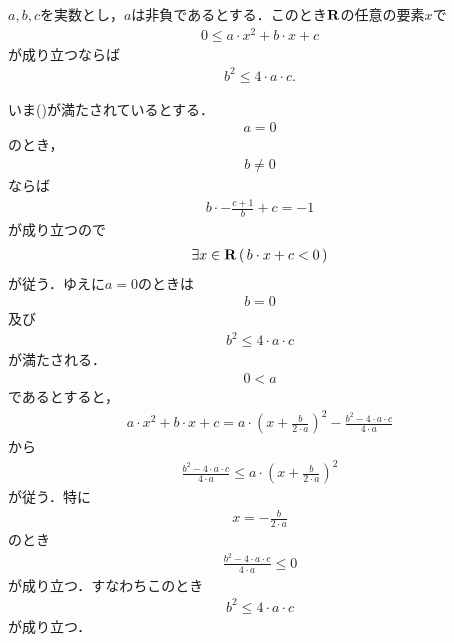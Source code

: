 	\begin{screen}
		\begin{thm}[二次関数が非負であるための条件]
		\label{thm:nonnegative_condition_of_quadratic_function}
			$a,b,c$を実数とし，$a$は非負であるとする．このとき$\mathbf{R}$の任意の要素$x$で
			\begin{align}
				0 \leq a \cdot x^{2} + b \cdot x + c
				\label{fom:nonnegative_condition_of_quadratic_function}
			\end{align}
			が成り立つならば
			\begin{align}
				b^{2} \leq 4 \cdot a \cdot c.
			\end{align}
		\end{thm}
	\end{screen}
	
	\begin{sketch}
		いま()が満たされているとする．
		\begin{align}
			a=0
		\end{align}
		のとき，
		\begin{align}
			b \neq 0
		\end{align}
		ならば
		\begin{align}
			b \cdot -\frac{c+1}{b} + c = -1
		\end{align}
		が成り立つので
		\begin{align}
			\exists x \in \mathbf{R}\, (\, b \cdot x + c < 0\, )
		\end{align}
		が従う．ゆえに$a=0$のときは
		\begin{align}
			b = 0
		\end{align}
		及び
		\begin{align}
			b^{2} \leq 4 \cdot a \cdot c
		\end{align}
		が満たされる．
		\begin{align}
			0 < a
		\end{align}
		であるとすると，
		\begin{align}
			a \cdot x^{2} + b \cdot x + c
			= a \cdot \left(x+\frac{b}{2 \cdot a}\right)^{2} - \frac{b^{2} - 4 \cdot a \cdot c}{4 \cdot a}
		\end{align}
		から
		\begin{align}
			\frac{b^{2} - 4 \cdot a \cdot c}{4 \cdot a}
			\leq a \cdot \left(x+\frac{b}{2 \cdot a}\right)^{2}
		\end{align}
		が従う．特に
		\begin{align}
			x = -\frac{b}{2 \cdot a}
		\end{align}
		のとき
		\begin{align}
			\frac{b^{2} - 4 \cdot a \cdot c}{4 \cdot a} \leq 0
		\end{align}
		が成り立つ．すなわちこのとき
		\begin{align}
			b^{2} \leq 4 \cdot a \cdot c
		\end{align}
		が成り立つ．
		\QED
	\end{sketch}
	
